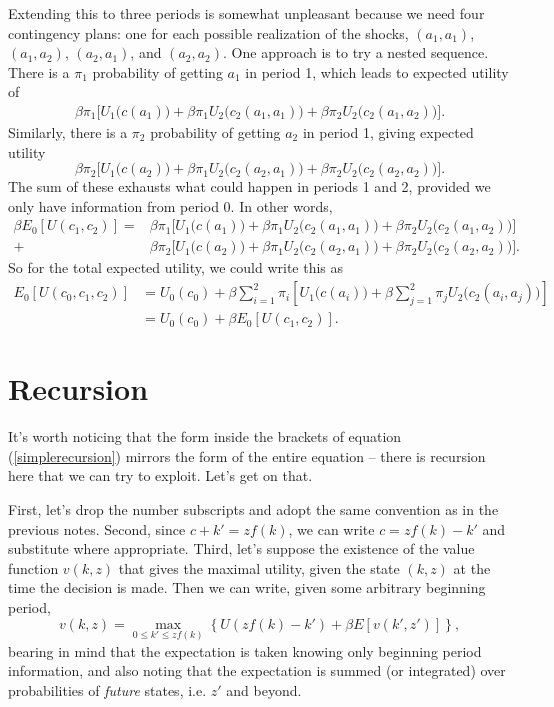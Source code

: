 \documentclass[12pt]{article}
\theoremstyle{definition}
\begin{document}
Extending this to three periods is somewhat unpleasant because we need four contingency plans: one for each possible realization of the shocks, $(a_1, a_1)$, $(a_1, a_2)$, $(a_2, a_1)$, and $(a_2, a_2)$.  One approach is to try a nested sequence. There is a $\pi_1$ probability of getting $a_1$ in period 1, which leads to  expected utility of 
\begin{align*}	
	\beta \pi_1 \big[ U_1\big( c(a_1) \big)  + \beta \pi_1 U_2\big( c_2(a_1, a_1) \big ) + \beta \pi_2 U_2\big( c_2(a_1, a_2) \big )\big].
\end{align*}
Similarly, there is a $\pi_2$ probability of getting $a_2$ in period 1, giving expected utility
	\[\beta \pi_2 \big[ U_1\big( c(a_2) \big)  + \beta \pi_1 U_2\big( c_2(a_2, a_1) \big ) + \beta \pi_2 U_2\big( c_2(a_2, a_2) \big) \big].	\]
The sum of these exhausts what could happen in periods 1 and 2, provided we only have information from period 0. In other words, 
\begin{align*}
	\beta E_0[U(c_1, c_2)] = 	&\beta \pi_1 \big[ U_1\big( c(a_1) \big)  + \beta \pi_1 U_2\big( c_2(a_1, a_1) \big ) + \beta \pi_2 U_2\big( c_2(a_1, a_2) \big )\big]\\
	 + &\beta \pi_2 \big[ U_1\big( c(a_2) \big)  + \beta \pi_1 U_2\big( c_2(a_2, a_1) \big )
	 + \beta \pi_2 U_2\big( c_2(a_2, a_2) \big) \big].
\end{align*}
So for the total expected utility, we could write this as
\begin{align}
	E_0[ U(c_0, c_1,c_2)]  &= U_0(c_0)	 + \beta \sum_{i=1}^2 \pi_i \left[ U_1\big( c(a_i) \big) +  \beta \sum_{j=1}^2 \pi_j U_2\big( c_2(a_i, a_j) \big) \right] \\
	&= U_0(c_0) + \beta E_0[U(c_1, c_2)] . \label{simplerecursion}
\end{align}



\section{Recursion} 

It's worth noticing that the form inside the brackets of equation (\ref{simplerecursion}) mirrors the form of the entire equation -- there is recursion here that we can try to exploit. Let's get on that.

First, let's drop the number subscripts and adopt the same convention as in the previous notes. Second, since $c + k' = zf(k)$, we can write $c = zf(k) - k'$ and substitute where appropriate. Third, let's suppose the existence of the value function $v(k, z)$ that gives the maximal utility, given the state $(k,z)$ at the time the decision is made. Then we can write, given some arbitrary beginning period,
	\[v(k,z) = \max_{0 \leq k' \leq zf(k)}	\left \{ U(zf(k) - k') + \beta E[v(k', z')]\right \},\]	
bearing in mind that the expectation is taken knowing only beginning period information, and also noting that the expectation is summed (or integrated) over probabilities of \emph{future} states, i.e. $z'$ and beyond.
\end{document}
